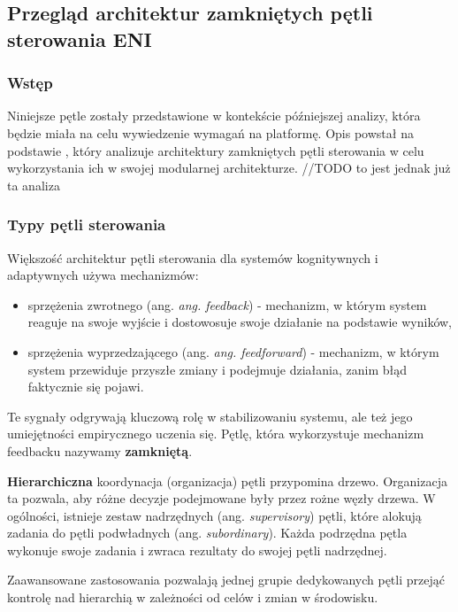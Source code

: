 \subsection{Przegląd architektur zamkniętych pętli sterowania ENI}\hypertarget{sec:25}{}

\subsubsection{Wstęp}

Niniejsze pętle zostały przedstawione w kontekście późniejszej analizy, która będzie miała na celu wywiedzenie wymagań na platformę. Opis powstał na podstawie \cite{etsieni2024}, który analizuje architektury zamkniętych pętli sterowania w celu wykorzystania ich w swojej modularnej architekturze. //TODO to jest jednak już ta analiza

\subsubsection{Typy pętli sterowania}

Większość architektur pętli sterowania dla systemów kognitywnych i adaptywnych używa mechanizmów:
\begin{itemize}
    \item sprzężenia zwrotnego (ang. \textit{ang. feedback}) - mechanizm, w którym system reaguje na swoje wyjście i dostowosuje swoje działanie na podstawie wyników,
    \item sprzężenia wyprzedzającego (ang. \textit{ang. feedforward}) - mechanizm, w którym system przewiduje przyszłe zmiany i podejmuje działania, zanim błąd faktycznie się pojawi.
\end{itemize}

Te sygnały odgrywają kluczową rolę w stabilizowaniu systemu, ale też jego umiejętności empirycznego uczenia się. Pętlę, która wykorzystuje mechanizm feedbacku nazywamy \textbf{zamkniętą}.

\textbf{Hierarchiczna} koordynacja (organizacja) pętli przypomina drzewo. Organizacja ta pozwala, aby różne decyzje podejmowane były przez rożne węzły drzewa. W ogólności, istnieje zestaw nadrzędnych (ang. \textit{supervisory}) pętli, które alokują zadania do pętli podwładnych (ang. \textit{subordinary}). Każda podrzędna pętla wykonuje swoje zadania i zwraca rezultaty do swojej pętli nadrzędnej. 

Zaawansowane zastosowania pozwalają jednej grupie dedykowanych pętli przejąć kontrolę nad hierarchią w zależności od celów i zmian w środowisku. 


